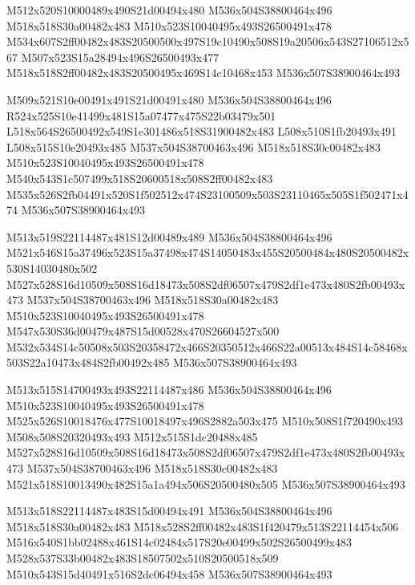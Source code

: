 \documentclass{article}
\begin{document}
\begin{multicols}{5}
\begin{center}

M512x520S10000489x490S21d00494x480 %
M536x504S38800464x496 %
M518x518S30a00482x483 %
M510x523S10040495x493S26500491x478 %
M534x607S2ff00482x483S20500500x497S19c10490x508S19a20506x543S27106512x567 %
M507x523S15a28494x496S26500493x477 %
M518x518S2ff00482x483S20500495x469S14c10468x453 %
M536x507S38900464x493 %
\vfil
\columnbreak

M509x521S10e00491x491S21d00491x480 %
M536x504S38800464x496 %
R524x525S10e41499x481S15a07477x475S22b03479x501 %
L518x564S26500492x549S1e301486x518S31900482x483 %
L508x510S1fb20493x491 %
L508x515S10e20493x485 %
M537x504S38700463x496 %
M518x518S30c00482x483 %
M510x523S10040495x493S26500491x478 %
M540x543S1c507499x518S20600518x508S2ff00482x483 %
M535x526S2fb04491x520S1f502512x474S23100509x503S23110465x505S1f502471x474 %
M536x507S38900464x493 %
\vfil
\columnbreak

M513x519S22114487x481S12d00489x489 %
M536x504S38800464x496 %
M521x546S15a37496x523S15a37498x474S14050483x455S20500484x480S20500482x530S14030480x502 %
M527x528S16d10509x508S16d18473x508S2df06507x479S2df1e473x480S2fb00493x473 %
M537x504S38700463x496 %
M518x518S30a00482x483 %
M510x523S10040495x493S26500491x478 %
M547x530S36d00479x487S15d00528x470S26604527x500 %
M532x534S14c50508x503S20358472x466S20350512x466S22a00513x484S14c58468x503S22a10473x484S2fb00492x485 %
M536x507S38900464x493 %
\vfil
\columnbreak

M513x515S14700493x493S22114487x486 %
M536x504S38800464x496 %
M510x523S10040495x493S26500491x478 %
M525x526S10018476x477S10018497x496S2882a503x475 %
M510x508S1f720490x493 %
M508x508S20320493x493 %
M512x515S1dc20488x485 %
M527x528S16d10509x508S16d18473x508S2df06507x479S2df1e473x480S2fb00493x473 %
M537x504S38700463x496 %
M518x518S30c00482x483 %
M521x518S10013490x482S15a1a494x506S20500480x505 %
M536x507S38900464x493 %
\vfil
\columnbreak

M513x518S22114487x483S15d00494x491 %
M536x504S38800464x496 %
M518x518S30a00482x483 %
M518x528S2ff00482x483S1f420479x513S22114454x506 %
M516x540S1bb02488x461S14c02484x517S20e00499x502S26500499x483 %
M528x537S33b00482x483S18507502x510S20500518x509 %
M510x543S15d40491x516S2dc06494x458 %
M536x507S38900464x493 %
\vfil

\end{center}
\end{multicols}
\end{document}
